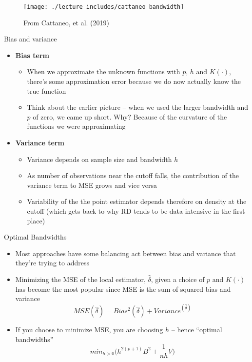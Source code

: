 \documentclass{beamer}
\begin{document}
\begin{frame}

		\begin{figure}
		\texttt{[image: ./lecture\_includes/cattaneo\_bandwidth]}
		\caption{From Cattaneo, et al. (2019)}
		\end{figure}

\end{frame}




\begin{frame}{Bias and variance}

\begin{itemize}
\item \textbf{Bias term}
	\begin{itemize}
	\item When we approximate the unknown functions with $p$, $h$ and $K(\cdot)$, there's some approximation error because we do now actually know the true function
	\item Think about the earlier picture -- when we used the larger bandwidth and $p$ of zero, we came up short. Why? Because of the curvature of the functions we were approximating
	\end{itemize}
\item \textbf{Variance term}
	\begin{itemize}
	\item Variance depends on sample size and bandwidth $h$
	\item As number of observations near the cutoff falls, the contribution of the variance term to MSE grows and vice versa
	\item Variability of the the point estimator depends therefore on density at the cutoff (which gets back to why RD tends to be data intensive in the first place)
	\end{itemize}
\end{itemize}

\end{frame}

\begin{frame}{Optimal Bandwidths}

\begin{itemize}
\item Most approaches have some balancing act between bias and variance that they're trying to address
\item Minimizing the MSE of the local estimator, $\widehat{\delta}$, given a choice of $p$ and $K(\cdot)$ has become the most popular since MSE is the sum of squared bias and variance $$MSE(\widehat{\delta}) = Bias^2(\widehat{\delta}) + Variance^(\widehat{\delta})$$
\item If you choose to minimize MSE, you are choosing $h$ -- hence ``optimal bandwidths'' $$min_{h>0} \bigg (h^{2(p+1)}B^2+\frac{1}{nh}V \bigg )$$
\end{itemize}

\end{frame}
\end{document}
